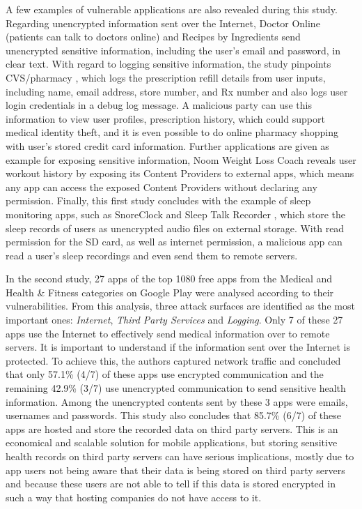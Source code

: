 A few examples of vulnerable applications are also revealed during this study. Regarding unencrypted information sent over the Internet, Doctor Online \cite{doctoronline} (patients can talk to doctors online) and Recipes by Ingredients \cite{recipesbyingredients} send unencrypted sensitive information, including the user's email and password, in clear text. With regard to logging sensitive information, the study pinpoints CVS/pharmacy \cite{cvspharmacy}, which logs the prescription refill details from user inputs, including name, email address, store number, and Rx number and also logs user login credentials in a debug log message. A malicious party can use this information to view user profiles, prescription history, which could support medical identity theft, and it is even possible to do online pharmacy shopping with user's stored credit card information. Further applications are given as example for exposing sensitive information, Noom Weight Loss Coach \cite{noomwlc} reveals user workout history by exposing its Content Providers to external apps, which means any app can access the exposed Content Providers without declaring any permission. Finally, this first study concludes with the example of sleep monitoring apps, such as SnoreClock \cite{snoreclock} and Sleep Talk Recorder \cite{sleeptalk}, which store the sleep records of users as unencrypted audio files on external storage. With read permission for the SD card, as well as internet permission, a malicious app can read a user's sleep recordings and even send them to remote servers.

In the second study, 27 apps of the top 1080 free apps from the Medical and Health \& Fitness categories on Google Play were analysed according to their vulnerabilities. From this analysis, three attack surfaces are identified as the most important ones: \emph{Internet}, \emph{Third Party Services} and \emph{Logging}. Only 7 of these 27 apps use the Internet to effectively send medical information over to remote servers. It is important to understand if the information sent over the Internet is protected. To achieve this, the authors captured network traffic and concluded that only 57.1\% (4/7) of these apps use encrypted communication and the remaining 42.9\% (3/7) use unencrypted communication to send sensitive health information. Among the unencrypted contents sent by these 3 apps were emails, usernames and passwords. This study also concludes that 85.7\% (6/7) of these apps are hosted and store the recorded data on third party servers. This is an economical and scalable solution for mobile applications, but storing sensitive health records on third party servers can have serious implications, mostly due to app users not being aware that their data is being stored on third party servers and because these users are not able to tell if this data is stored encrypted in such a way that hosting companies do not have access to it.

